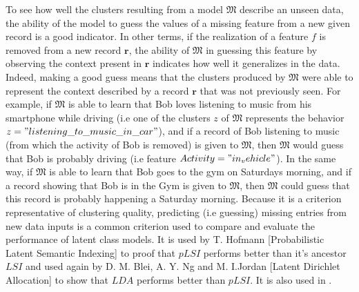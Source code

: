 To see how well the clusters resulting from a model $\mathfrak{M}$ describe an unseen data, the ability of the model to guess the values of a missing feature from a new given record is a good indicator. In other terms, if the realization of a feature $f$ is removed from a new record $\mathbf{r}$, the ability of $\mathfrak{M}$ in guessing this feature by observing the context present in $\mathbf{r}$ indicates how well it generalizes in the data. Indeed, making a good guess means that the clusters produced by $\mathfrak{M}$ were able to represent the context described by a record $\mathbf{r}$ that was not previously seen. For example, if $\mathfrak{M}$ is able to learn that Bob loves listening to music from his smartphone while driving (i.e one of the clusters $z$ of $\mathfrak{M}$ represents the behavior $z="listening\_to\_music\_in\_car"$), and if a record of Bob listening to music (from which the activity of Bob is removed) is given to $\mathfrak{M}$, then $\mathfrak{M}$ would guess that Bob is probably driving (i.e feature $Activity="in_vehicle"$). In the same way, if $\mathfrak{M}$ is able to learn that Bob goes to the gym on Saturdays morning, and if a record showing that Bob is in the Gym is given to $\mathfrak{M}$, then $\mathfrak{M}$ could guess that this record is probably happening a Saturday morning. Because it is a criterion representative of clustering quality, predicting (i.e guessing) missing entries from new data inputs is a common criterion used to compare and evaluate the performance of latent class models. It is used by T. Hofmann [Probabilistic Latent Semantic Indexing]\cite{plsi} to proof that $pLSI$ performs better than it's ancestor $LSI$\cite{lsi} and used again by D. M. Blei, A. Y. Ng and M. I.Jordan [Latent Dirichlet Allocation]\cite{lda} to show that $LDA$ performs better than $pLSI$. It is also used in \cite{inferencecomp, gibbsaverage, gibbsunseen}.\par


